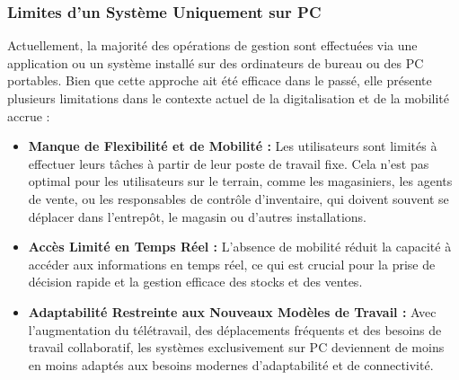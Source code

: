 \documentclass[a4paper, oneside, 12pt, final]{extreport}
\begin{document}
\subsubsection{Limites d'un Système Uniquement sur PC}
Actuellement, la majorité des opérations de gestion sont effectuées via une application ou un système installé sur des ordinateurs de bureau ou des PC portables. Bien que cette approche ait été efficace dans le passé, elle présente plusieurs limitations dans le contexte actuel de la digitalisation et de la mobilité accrue :
\begin{itemize}


\item \textbf{Manque de Flexibilité et de Mobilité :} Les utilisateurs sont limités à effectuer leurs tâches à partir de leur poste de travail fixe. Cela n'est pas optimal pour les utilisateurs sur le terrain, comme les magasiniers, les agents de vente, ou les responsables de contrôle d'inventaire, qui doivent souvent se déplacer dans l'entrepôt, le magasin ou d'autres installations.

\item \textbf{Accès Limité en Temps Réel :} L'absence de mobilité réduit la capacité à accéder aux informations en temps réel, ce qui est crucial pour la prise de décision rapide et la gestion efficace des stocks et des ventes.

\item \textbf{Adaptabilité Restreinte aux Nouveaux Modèles de Travail :} Avec l'augmentation du télétravail, des déplacements fréquents et des besoins de travail collaboratif, les systèmes exclusivement sur PC deviennent de moins en moins adaptés aux besoins modernes d'adaptabilité et de connectivité.
\end{itemize}
\end{document}
